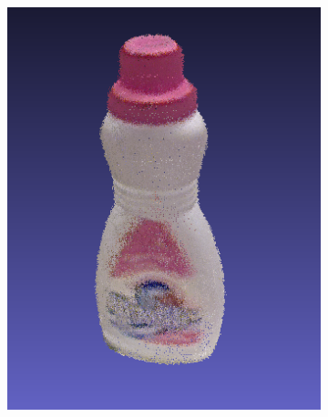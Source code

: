 \documentclass[letterpaper, 10 pt, conference]{ieeeconf}  %
\begin{document}
\begin{figure}[th]
        \begin{subfigure}[b]{0.333333\linewidth}
                \centering
                \includegraphics[width=\linewidth]{../models/rose_bottle.png}
        \end{subfigure}%
        \begin{subfigure}[b]{0.333333\linewidth}
                \centering

\end{subfigure}
\end{figure}
\end{document}
